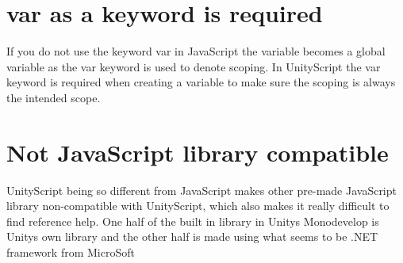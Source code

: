 \section {var as a keyword is required}
If you do not use the keyword var in JavaScript the variable becomes a global variable as the var keyword is used to denote scoping. In UnityScript the var keyword is required when creating a variable to make sure the scoping is always the intended scope.

\section {Not JavaScript library compatible}
UnityScript being so different from JavaScript makes other pre-made JavaScript library non-compatible with UnityScript, which also makes it really difficult to find reference help. One half of the built in library in Unitys Monodevelop is Unitys own library and the other half is made using what seems to be .NET framework from MicroSoft
